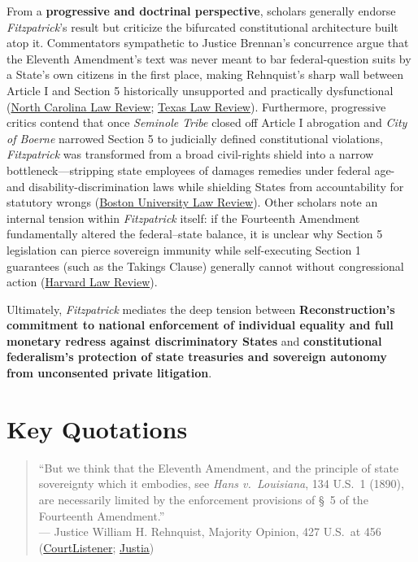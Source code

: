 \documentclass[12pt]{article}
\begin{document}
From a \textbf{progressive and doctrinal perspective}, scholars generally endorse \textit{Fitzpatrick}'s result but criticize the bifurcated constitutional architecture built atop it. Commentators sympathetic to Justice Brennan's concurrence argue that the Eleventh Amendment's text was never meant to bar federal-question suits by a State's own citizens in the first place, making Rehnquist's sharp wall between Article I and Section 5 historically unsupported and practically dysfunctional (\href{https://scholarship.law.unc.edu/cgi/viewcontent.cgi?article=1229&context=faculty_publications}{North Carolina Law Review}; \href{https://texaslawreview.org/state-sovereign-immunity-after-the-revolution/}{Texas Law Review}). Furthermore, progressive critics contend that once \textit{Seminole Tribe} closed off Article I abrogation and \textit{City of Boerne} narrowed Section 5 to judicially defined constitutional violations, \textit{Fitzpatrick} was transformed from a broad civil-rights shield into a narrow bottleneck---stripping state employees of damages remedies under federal age- and disability-discrimination laws while shielding States from accountability for statutory wrongs (\href{https://www.bu.edu/bulawreview/files/2014/08/REN.pdf}{Boston University Law Review}). Other scholars note an internal tension within \textit{Fitzpatrick} itself: if the Fourteenth Amendment fundamentally altered the federal--state balance, it is unclear why Section 5 legislation can pierce sovereign immunity while self-executing Section 1 guarantees (such as the Takings Clause) generally cannot without congressional action (\href{https://harvardlawreview.org/print/vol-129/reconciling-state-sovereign-immunity-with-the-fourteenth-amendment/}{Harvard Law Review}).

Ultimately, \textit{Fitzpatrick} mediates the deep tension between \textbf{Reconstruction's commitment to national enforcement of individual equality and full monetary redress against discriminatory States} and \textbf{constitutional federalism's protection of state treasuries and sovereign autonomy from unconsented private litigation}.

\section{Key Quotations}

\begin{quote}
``But we think that the Eleventh Amendment, and the principle of state sovereignty which it embodies, see \textit{Hans v.\ Louisiana}, 134 U.S.\ 1 (1890), are necessarily limited by the enforcement provisions of \S~5 of the Fourteenth Amendment.''\\
--- Justice William H. Rehnquist, Majority Opinion, 427 U.S.\ at 456 (\href{https://www.courtlistener.com/opinion/109520/fitzpatrick-v-bitzer/}{CourtListener}; \href{https://supreme.justia.com/cases/federal/us/427/445/}{Justia})
\end{quote}
\end{document}

